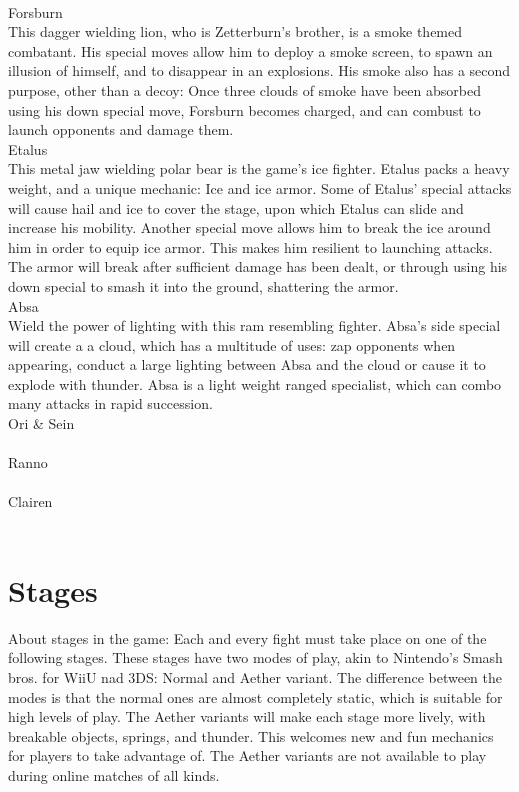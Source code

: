 \documentclass[11pt]{article}
\begin{document}
\\
Forsburn\\
This dagger wielding lion, who is Zetterburn's brother, is a smoke themed combatant. His special moves allow him to deploy a smoke screen, to spawn an illusion of himself, and to disappear in an explosions. His smoke also has a second purpose, other than a decoy: Once three clouds of smoke have been absorbed using his down special move, Forsburn becomes charged, and can combust to launch opponents and damage them.
\\
Etalus\\
This metal jaw wielding polar bear is the game's ice fighter. Etalus packs a heavy weight, and a unique mechanic: Ice and ice armor. Some of Etalus' special attacks will cause hail and ice to cover the stage, upon which Etalus can slide and increase his mobility. Another special move allows him to break the ice around him in order to equip ice armor. This makes him resilient to launching attacks. The armor will break after sufficient damage has been dealt, or through using his down special to smash it into the ground, shattering the armor.
\\
Absa\\
Wield the power of lighting with this ram resembling fighter. Absa's side special will create a a cloud, which has a multitude of uses: zap opponents when appearing, conduct a large lighting between Absa and the cloud or cause it to explode with thunder. Absa is a light weight ranged specialist, which can combo many attacks in rapid succession.
\\
Ori & Sein\\
\\
Ranno\\
\\
Clairen\\
\\

\chapter{Stages}

About stages in the game: Each and every fight must take place on one of the following stages. These stages have two modes of play, akin to Nintendo's Smash bros. for WiiU nad 3DS: Normal and Aether variant. The difference between the modes is that the normal ones are almost completely static, which is suitable for high levels of play. The Aether variants will make each stage more lively, with breakable objects, springs, and thunder. This welcomes new and fun mechanics for players to take advantage of. The Aether variants are not available to play during online matches of all kinds.\\
\end{document}
